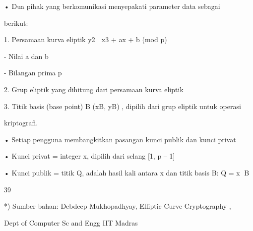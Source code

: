 \documentclass{article}
\begin{document}

• Dua pihak yang berkomunikasi menyepakati parameter data sebagai 

berikut:

 1. Persamaan kurva eliptik y2  x3 + ax + b  (mod p)


- Nilai a dan b


- Bilangan prima p

 2.  Grup eliptik yang dihitung dari persamaan kurva eliptik

   3.  Titik basis (base point) B (xB, yB) , dipilih dari grup eliptik untuk operasi 

kriptografi. 

• Setiap pengguna membangkitkan pasangan kunci publik dan kunci privat

• Kunci privat = integer x, dipilih dari selang [1, p – 1]

• Kunci publik = titik Q, adalah hasil kali antara x dan titik basis B: Q = x B 

39

*) Sumber bahan: Debdeep Mukhopadhyay, Elliptic Curve Cryptography ,

 Dept of Computer Sc and Engg IIT Madras
\end{document}
